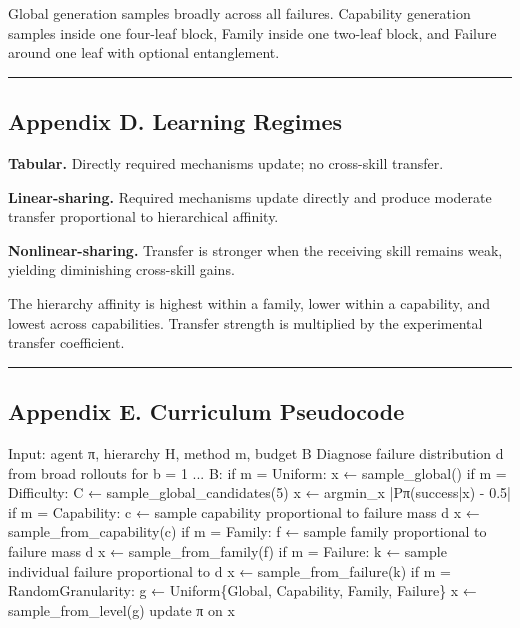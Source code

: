 \documentclass[
]{article}
\newenvironment{Shaded}{}{}
\newcommand{\NormalTok}[1]{#1}
\begin{document}
Global generation samples broadly across all failures. Capability
generation samples inside one four-leaf block, Family inside one
two-leaf block, and Failure around one leaf with optional entanglement.

\begin{center}\rule{0.5\linewidth}{0.5pt}\end{center}

\subsection{Appendix D. Learning
Regimes}\label{appendix-d.-learning-regimes}

\textbf{Tabular.} Directly required mechanisms update; no cross-skill
transfer.

\textbf{Linear-sharing.} Required mechanisms update directly and produce
moderate transfer proportional to hierarchical affinity.

\textbf{Nonlinear-sharing.} Transfer is stronger when the receiving
skill remains weak, yielding diminishing cross-skill gains.

The hierarchy affinity is highest within a family, lower within a
capability, and lowest across capabilities. Transfer strength is
multiplied by the experimental transfer coefficient.

\begin{center}\rule{0.5\linewidth}{0.5pt}\end{center}

\subsection{Appendix E. Curriculum
Pseudocode}\label{appendix-e.-curriculum-pseudocode}

\begin{Shaded}
\begin{Highlighting}[]
\NormalTok{Input: agent π, hierarchy H, method m, budget B}
\NormalTok{Diagnose failure distribution d from broad rollouts}
\NormalTok{for b = 1 ... B:}
\NormalTok{    if m = Uniform:}
\NormalTok{        x ← sample\_global()}
\NormalTok{    if m = Difficulty:}
\NormalTok{        C ← sample\_global\_candidates(5)}
\NormalTok{        x ← argmin\_x |Pπ(success|x) {-} 0.5|}
\NormalTok{    if m = Capability:}
\NormalTok{        c ← sample capability proportional to failure mass d}
\NormalTok{        x ← sample\_from\_capability(c)}
\NormalTok{    if m = Family:}
\NormalTok{        f ← sample family proportional to failure mass d}
\NormalTok{        x ← sample\_from\_family(f)}
\NormalTok{    if m = Failure:}
\NormalTok{        k ← sample individual failure proportional to d}
\NormalTok{        x ← sample\_from\_failure(k)}
\NormalTok{    if m = RandomGranularity:}
\NormalTok{        g ← Uniform\{Global, Capability, Family, Failure\}}
\NormalTok{        x ← sample\_from\_level(g)}
\NormalTok{    update π on x}
\end{Highlighting}
\end{Shaded}
\end{document}
